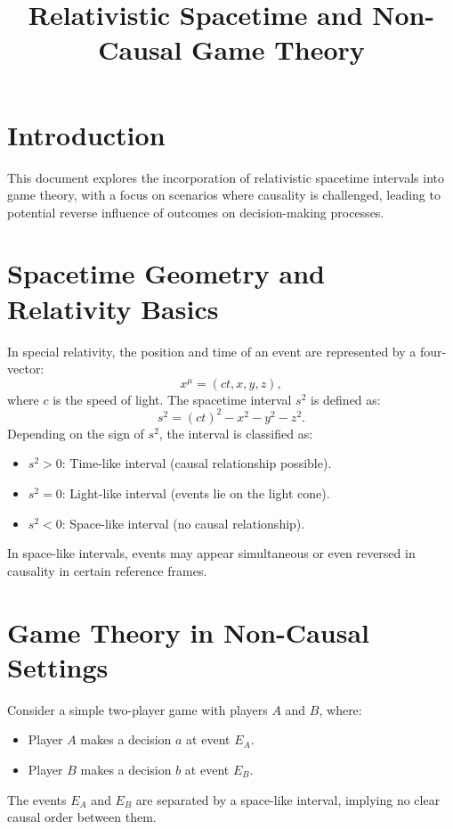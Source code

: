 \documentclass{article}
\begin{document}
\title{Relativistic Spacetime and Non-Causal Game Theory}
\author{}
\date{}
\maketitle

\section{Introduction}
This document explores the incorporation of relativistic spacetime intervals into game theory, with a focus on scenarios where causality is challenged, leading to potential reverse influence of outcomes on decision-making processes.

\section{Spacetime Geometry and Relativity Basics}
In special relativity, the position and time of an event are represented by a four-vector:
\begin{equation}
    x^\mu = (ct, x, y, z),
\end{equation}
where $c$ is the speed of light. The spacetime interval $s^2$ is defined as:
\begin{equation}
    s^2 = (ct)^2 - x^2 - y^2 - z^2.
\end{equation}
Depending on the sign of $s^2$, the interval is classified as:
\begin{itemize}
    \item $s^2 > 0$: Time-like interval (causal relationship possible).
    \item $s^2 = 0$: Light-like interval (events lie on the light cone).
    \item $s^2 < 0$: Space-like interval (no causal relationship).
\end{itemize}
In space-like intervals, events may appear simultaneous or even reversed in causality in certain reference frames.

\section{Game Theory in Non-Causal Settings}
Consider a simple two-player game with players $A$ and $B$, where:
\begin{itemize}
    \item Player $A$ makes a decision $a$ at event $E_A$.
    \item Player $B$ makes a decision $b$ at event $E_B$.
\end{itemize}
The events $E_A$ and $E_B$ are separated by a space-like interval, implying no clear causal order between them.
\end{document}
